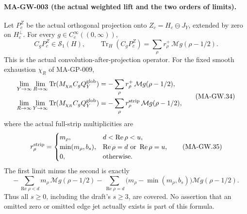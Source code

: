 \paragraph{MA-GW-003 (the actual weighted lift and the two orders of limits).}
Let $P_c^Z$ be the actual orthogonal projection onto
$Z_c=H_c\ominus J_Y$, extended by zero on $H_c^\perp$.
For every $g\in C_c^\infty((0,\infty))$,
\[
 C_gP_c^Z\in\mathcal S_1(H),\qquad
 \operatorname{Tr}_H(C_gP_c^Z)
        =\sum_\rho r^+_\rho\,\mathcal Mg(\rho-1/2).
 \tag{MA-GW.33}
\]
This is the actual convolution-after-projection operator.
For the fixed smooth exhaustion $\chi_R$ of MA-GP-009,
\[
 \begin{aligned}
 \lim_{Y\to\infty}\lim_{R\to\infty}
    \operatorname{Tr}(M_{\chi_R}C_gQ_Y^{\rm glob})
      &=-\sum_\rho r^+_\rho\,\mathcal Mg(\rho-1/2),\\
 \lim_{R\to\infty}\lim_{Y\to\infty}
    \operatorname{Tr}(M_{\chi_R}C_gQ_Y^{\rm glob})
      &=-\sum_\rho r^{\rm strip}_\rho\,\mathcal Mg(\rho-1/2),
 \end{aligned}
 \tag{MA-GW.34}
\]
where the actual full-strip multiplicities are
\[
 r^{\rm strip}_\rho=
 \begin{cases}
 m_\rho,&d<\operatorname{Re}\rho<u,\\
 \min(m_\rho,b_s),&\operatorname{Re}\rho=d
                                \ \hbox{or}\ \operatorname{Re}\rho=u,\\
 0,&\hbox{otherwise}.
 \end{cases}
 \tag{MA-GW.35}
\]
The first limit minus the second is exactly
\[
 -\sum_{\operatorname{Re}\rho<d}m_\rho\,\mathcal Mg(\rho-1/2)
 -\sum_{\operatorname{Re}\rho=d}
          \bigl(m_\rho-\min(m_\rho,b_s)\bigr)
                                    \mathcal Mg(\rho-1/2).
 \tag{MA-GW.36}
\]
Thus all $s\ge0$, including the draft's $s\ge3$, are covered.
No assertion that an omitted zero or omitted edge jet actually
exists is part of this formula.

